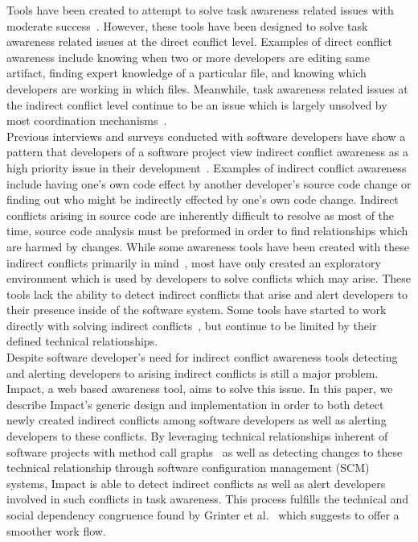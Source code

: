 \documentclass[conference]{IEEEtran}
\begin{document}
Tools have been created to attempt to solve task awareness related issues
with moderate success~\cite{Xiang:2008:ERT, Biehl:2007:FVD, Sarma:2009:TIV, 
Khurana:2009:PFC}. However, these tools have been designed 
to solve task awareness related issues at the direct conflict level. 
Examples of direct conflict awareness include knowing when two or more 
developers are  editing same artifact, finding expert knowledge of a
particular file, and knowing which developers are working in which files.
Meanwhile, task awareness related issues at the indirect conflict level
continue to be an issue which is largely unsolved by most coordination
mechanisms~\cite{Khurana:2009:PFC}.\\

Previous interviews and surveys conducted with software developers have 
show a pattern that developers of a software project view indirect conflict 
awareness  as a high priority issue in their development~\cite{Damian:2007:GSE, 
Halverson:2006:DTV, Begel:2010:CDE, Schroter:2012:TTF}. Examples 
of indirect conflict awareness
include having one's own code effect by another developer's source
code change or finding out who might be indirectly effected by one's
own code change. Indirect conflicts arising in source code are inherently
difficult to resolve as most of the time, source code analysis must
be preformed in order to find relationships which are harmed by changes.
While some awareness tools have been created with these indirect conflicts
primarily in mind~\cite{Begel:2010:CDE, Trainer:2005:BGT}, most have only 
created an exploratory environment which is used by developers to
solve conflicts which may arise. These tools lack the ability to detect
indirect conflicts that arise and alert developers to their presence 
inside of the software system. Some tools have started to work directly
with solving indirect conflicts~\cite{Sarma:2007:TSA}, but continue
to be limited by their defined technical relationships.\\ 

Despite software developer's need for indirect conflict awareness tools
detecting and alerting developers to arising indirect conflicts is still a major
problem. Impact, a web based awareness
tool, aims to solve this issue. In this paper, we describe Impact's generic
design and implementation in order to both detect newly created
indirect conflicts among software developers as well as alerting developers
to these conflicts. By leveraging technical relationships inherent of 
software projects with method call graphs~\cite{Lakhotia:1993:CCM}
 as well as detecting changes
to these technical relationship through software configuration management
(SCM) systems, Impact is able to detect indirect conflicts as well as
alert developers involved in such conflicts in task awareness. This process
fulfills the technical and social dependency congruence found by 
Grinter  et al.~\cite{Grinter:2003:RCW} which suggests to offer a smoother
work flow.\\
\end{document}
